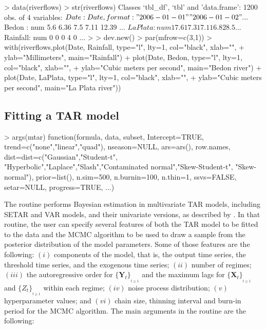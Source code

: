 \begin{example}
> data(riverflows)
> str(riverflows)
Classes ‘tbl_df’, ‘tbl’ and 'data.frame':   1200 obs. of  4 variables:
 $ Date    : Date, format: "2006-01-01" "2006-01-02" ...
 $ Bedon   : num  5.6 6.36 7.5 7.11 12.39 ...
 $ LaPlata : num  17.6 17.3 17.1 16.8 28.5 ...
 $ Rainfall: num  0 0 0 4 0 ...
>
> dev.new()
> par(mfrow=c(3,1))
> with(riverflows,{plot(Date, Rainfall, type="l", lty=1, col="black", xlab="", 
+                       ylab="Millimeters", main="Rainfall")
+                  plot(Date, Bedon, type="l", lty=1, col="black", xlab="", 
+                       ylab="Cubic meters per second", main="Bedon river")
+                  plot(Date, LaPlata, type="l", lty=1, col="black", xlab="", 
+                       ylab="Cubic meters per second", main="La Plata river")})
\end{example}

\subsection{Fitting a TAR model}
\begin{example}
> args(mtar)
function(formula, data, subset, Intercept=TRUE, trend=c("none","linear","quad"), 
         nseason=NULL, ars=ars(), row.names, dist=dist=c("Gaussian","Student-t",
         "Hyperbolic","Laplace","Slash","Contaminated normal","Skew-Student-t",
         "Skew-normal"), prior=list(), n.sim=500, n.burnin=100, n.thin=1, 
         ssvs=FALSE, setar=NULL, progress=TRUE, ...)
\end{example}
The routine  performs Bayesian estimation in multivariate TAR models, including SETAR and VAR models, and their univariate versions, as described by \cite{VANEGAS2025}. In that routine, the user can specify several features of both the TAR model to be fitted to the data and the MCMC algorithm to be used to draw a sample from the posterior distribution of the model parameters. Some of those features are the following: $(i)$ components of the model, that is, the output time series, the threshold time series, and the exogenous time series; $(ii)$ number of regimes; $(iii)$ the autoregressive order for $\{\bm{Y}_t\}_{_{t\geq 1}}$ and the maximum lags for $\{\bm{X}_t\}_{_{t\geq 1}}$ and $\{Z_t\}_{_{t\geq 1}}$ within each regime; $(iv)$ noise process distribution; $(v)$ hyperparameter values; and $(vi)$ chain size, thinning interval and burn-in period for the MCMC algorithm. The main arguments in the routine  are the following:

